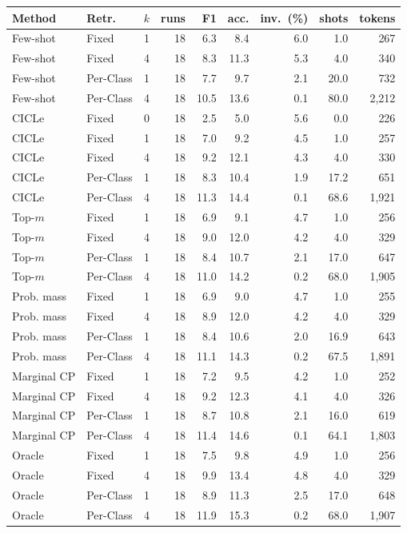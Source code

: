 \begin{tabular}{llrrrrrrr}
\toprule
Method & Retr. & $k$ & runs & F1 & acc. & inv.\ (\%) & shots & tokens \\
\midrule
Few-shot & Fixed & 1 & 18 & 6.3 & 8.4 & 6.0 & 1.0 & 267 \\
Few-shot & Fixed & 4 & 18 & 8.3 & 11.3 & 5.3 & 4.0 & 340 \\
Few-shot & Per-Class & 1 & 18 & 7.7 & 9.7 & 2.1 & 20.0 & 732 \\
Few-shot & Per-Class & 4 & 18 & 10.5 & 13.6 & 0.1 & 80.0 & 2,212 \\
CICLe & Fixed & 0 & 18 & 2.5 & 5.0 & 5.6 & 0.0 & 226 \\
CICLe & Fixed & 1 & 18 & 7.0 & 9.2 & 4.5 & 1.0 & 257 \\
CICLe & Fixed & 4 & 18 & 9.2 & 12.1 & 4.3 & 4.0 & 330 \\
CICLe & Per-Class & 1 & 18 & 8.3 & 10.4 & 1.9 & 17.2 & 651 \\
CICLe & Per-Class & 4 & 18 & 11.3 & 14.4 & 0.1 & 68.6 & 1,921 \\
\midrule
Top-$m$ & Fixed & 1 & 18 & 6.9 & 9.1 & 4.7 & 1.0 & 256 \\
Top-$m$ & Fixed & 4 & 18 & 9.0 & 12.0 & 4.2 & 4.0 & 329 \\
Top-$m$ & Per-Class & 1 & 18 & 8.4 & 10.7 & 2.1 & 17.0 & 647 \\
Top-$m$ & Per-Class & 4 & 18 & 11.0 & 14.2 & 0.2 & 68.0 & 1,905 \\
Prob. mass & Fixed & 1 & 18 & 6.9 & 9.0 & 4.7 & 1.0 & 255 \\
Prob. mass & Fixed & 4 & 18 & 8.9 & 12.0 & 4.2 & 4.0 & 329 \\
Prob. mass & Per-Class & 1 & 18 & 8.4 & 10.6 & 2.0 & 16.9 & 643 \\
Prob. mass & Per-Class & 4 & 18 & 11.1 & 14.3 & 0.2 & 67.5 & 1,891 \\
Marginal CP & Fixed & 1 & 18 & 7.2 & 9.5 & 4.2 & 1.0 & 252 \\
Marginal CP & Fixed & 4 & 18 & 9.2 & 12.3 & 4.1 & 4.0 & 326 \\
Marginal CP & Per-Class & 1 & 18 & 8.7 & 10.8 & 2.1 & 16.0 & 619 \\
Marginal CP & Per-Class & 4 & 18 & 11.4 & 14.6 & 0.1 & 64.1 & 1,803 \\
Oracle & Fixed & 1 & 18 & 7.5 & 9.8 & 4.9 & 1.0 & 256 \\
Oracle & Fixed & 4 & 18 & 9.9 & 13.4 & 4.8 & 4.0 & 329 \\
Oracle & Per-Class & 1 & 18 & 8.9 & 11.3 & 2.5 & 17.0 & 648 \\
Oracle & Per-Class & 4 & 18 & 11.9 & 15.3 & 0.2 & 68.0 & 1,907 \\
\bottomrule
\end{tabular}

